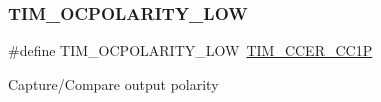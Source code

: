 \subsubsection{\texorpdfstring{TIM\_OCPOLARITY\_LOW}{TIM\_OCPOLARITY\_LOW}}
{\footnotesize\ttfamily \#define T\+I\+M\+\_\+\+O\+C\+P\+O\+L\+A\+R\+I\+T\+Y\+\_\+\+L\+OW~\mbox{\hyperlink{group___peripheral___registers___bits___definition_ga0ca0aedba14241caff739afb3c3ee291}{T\+I\+M\+\_\+\+C\+C\+E\+R\+\_\+\+C\+C1P}}}

Capture/\+Compare output polarity 
